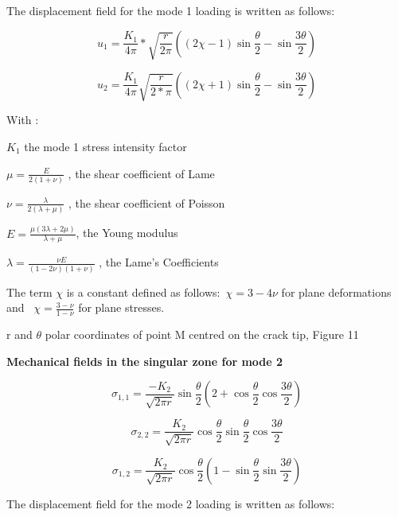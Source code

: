 The displacement field for the mode 1 loading is written as follows:

\begin{equation}
	u_{1} = \frac{K_{1}}{4 \pi}*\sqrt{\frac{r}{2 \pi}} \left((2 \chi-1) \sin{\frac{\theta}{2}}-\sin{\frac{3 \theta}{2}}\right)
\end{equation}

\begin{equation}
	u_{2} = \frac{K_{1}}{4 \pi} \sqrt{\frac{r}{2*\pi}} \left((2 \chi+1) \sin{\frac{\theta}{2}}-\sin{\frac{3 \theta}{2}}\right)
\end{equation}

With : 

$K_1$  the mode 1 stress intensity factor

$\mu=\frac{E}{2 (1+\nu)}$ , the shear coefficient of Lame

$\nu=\frac{\lambda}{2 (\lambda+\mu)}$ , the shear coefficient of Poisson

$E=\frac{\mu (3 \lambda+2 \mu)}{\lambda+\mu}$, the Young modulus

$\lambda=\frac{\nu E}{(1-2 \nu)(1+\nu)}$ , the Lame’s Coefficients

The term $\chi$ is a constant defined as follows:\ $\chi=3-4\nu$ for plane deformations and \ $\chi=\frac{3-\nu}{1-\nu}$  for plane stresses.

r and $\theta$ polar coordinates of point M centred on the crack tip, Figure 11

\smallskip

\textbf{Mechanical fields in the singular zone for mode 2}

\begin{equation}
	\sigma_{1,1} = \frac{-K_{2}}{\sqrt{2 \pi r}} \sin{\frac{\theta}{2}}  \left( 2+\cos{\frac{\theta}{2}} \cos{\frac{3 \theta}{2}} \right)
\end{equation}

\begin{equation}
	\sigma_{2,2} = \frac{K_{2}}{\sqrt{2 \pi r}} \cos{\frac{\theta}{2}}  \sin{\frac{\theta}{2}} \cos{\frac{3 \theta}{2}}
\end{equation}

\begin{equation}
	\sigma_{1,2} = \frac{K_{2}}{\sqrt{2 \pi r}} \cos{\frac{\theta}{2}}  \left( 1-\sin{\frac{\theta}{2}} \sin{\frac{3 \theta}{2}} \right)
\end{equation}

The displacement field for the mode 2 loading is written as follows:

